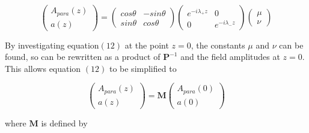 \documentclass[12pt]{article}
\begin{document}
\begin{equation}
\left( \begin{array}{ccc} A_{para}(z) \\ a(z) \end{array} \right) =
\left( \begin{array}{ccc} cos\theta & -sin\theta \\ sin\theta & cos\theta \end{array} \right)
\left( \begin{array}{ccc} e^{-i\lambda_+z } & 0 \\ 0 & e^{-i\lambda_-z} \end{array} \right) 
\left( \begin{array}{ccc} \mu \\ \nu \end{array} \right)
\end{equation}

By investigating equation$(12)$ at the point $z=0$, the constants $\mu$ and $\nu$ can be found, so can be rewritten as a product of $ \textbf{P}^{-1}$ and the field amplitudes at $z=0$. This allows equation $(12)$ to be simplified to 

\begin{equation}
\left( \begin{array}{ccc} A_{para}(z) \\ a(z) \end{array} \right) =
\textbf{M} \left( \begin{array}{ccc} A_{para}(0) \\ a(0) \end{array} \right)
\end{equation}

where $\textbf{M}$ is defined by
\end{document}
